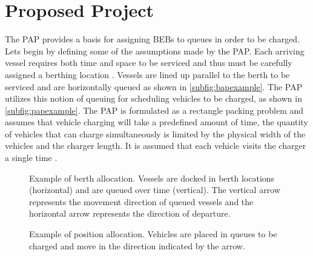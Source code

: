 \documentclass[11pt,a4paper,final]{article}
\begin{document}
\section{Proposed Project}
\label{sec:proposed-project}
The PAP provides a basis for assigning BEBs to queues in order to be charged. Lets begin by defining some of the
assumptions made by the PAP. Each arriving vessel requires both time and space to be serviced and thus must be carefully
assigned a berthing location \cite{imai-2001-dynam-berth}. Vessels are lined up parallel to the berth to be serviced
and are horizontally queued as shown in \autoref{subfig:bapexample}. The PAP utilizes this notion of queuing for
scheduling vehicles to be charged, as shown in \autoref{subfig:papexample}. The PAP is formulated as a rectangle packing
problem and assumes that vehicle charging will take a predefined amount of time, the quantity of vehicles that can
charge simultaneously is limited by the physical width of the vehicles and the charger length. It is assumed that each
vehicle visits the charger a single time \cite{qarebagh-2019-optim-sched}.

\begin{subfigures}
    \begin{figure}[htpb]
    \centering
        
        \caption{Example of berth allocation. Vessels are docked in berth locations (horizontal) and are queued over
          time (vertical). The vertical arrow represents the movement direction of queued vessels and the horizontal
          arrow represents the direction of departure.}
        \label{subfig:bapexample}
    \end{figure}
    \hfill

    \begin{figure}[htpb]
    \centering
        
        \caption{Example of position allocation. Vehicles are placed in queues to be charged and move in the direction
          indicated by the arrow.}
        \label{subfig:papexample}
    \end{figure}
\end{subfigures}
\end{document}
